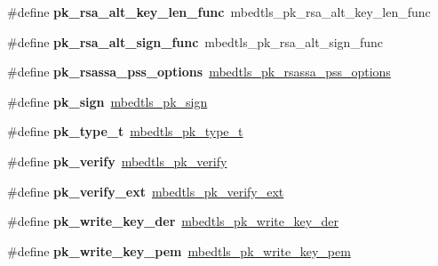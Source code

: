 \begin{DoxyCompactItemize}
\#define {\bfseries pk\+\_\+rsa\+\_\+alt\+\_\+key\+\_\+len\+\_\+func}~mbedtls\+\_\+pk\+\_\+rsa\+\_\+alt\+\_\+key\+\_\+len\+\_\+func
\item 
\mbox{\label{compat-1_83_8h_ad471f895a5d812225c8d4cad0f11d847}} 
\#define {\bfseries pk\+\_\+rsa\+\_\+alt\+\_\+sign\+\_\+func}~mbedtls\+\_\+pk\+\_\+rsa\+\_\+alt\+\_\+sign\+\_\+func
\item 
\mbox{\label{compat-1_83_8h_af4be01264f4ed1d6262f87fa44a5c256}} 
\#define {\bfseries pk\+\_\+rsassa\+\_\+pss\+\_\+options}~\mbox{\hyperlink{structmbedtls__pk__rsassa__pss__options}{mbedtls\+\_\+pk\+\_\+rsassa\+\_\+pss\+\_\+options}}
\item 
\mbox{\label{compat-1_83_8h_a47eaa47d311ef200c90a03b920f7b1cd}} 
\#define {\bfseries pk\+\_\+sign}~\mbox{\hyperlink{pk_8h_a6055db23bfff422e65b3a41400344d15}{mbedtls\+\_\+pk\+\_\+sign}}
\item 
\mbox{\label{compat-1_83_8h_ad7ae196adc1f1af4fa92668f0a2d721e}} 
\#define {\bfseries pk\+\_\+type\+\_\+t}~\mbox{\hyperlink{pk_8h_a3fe41eff5605ae727eb9d28dad297020}{mbedtls\+\_\+pk\+\_\+type\+\_\+t}}
\item 
\mbox{\label{compat-1_83_8h_a2ef728cb3127a9bf8e3248fe680f5a74}} 
\#define {\bfseries pk\+\_\+verify}~\mbox{\hyperlink{pk_8h_abf1939cc1d89f6b9fd341b67d5241914}{mbedtls\+\_\+pk\+\_\+verify}}
\item 
\mbox{\label{compat-1_83_8h_ab437028956d8b7da15fada82647e8312}} 
\#define {\bfseries pk\+\_\+verify\+\_\+ext}~\mbox{\hyperlink{pk_8h_a81f0c5e40b839f5eca676c2c2752036f}{mbedtls\+\_\+pk\+\_\+verify\+\_\+ext}}
\item 
\mbox{\label{compat-1_83_8h_aa627fd808393eadf3c33f55e804b334e}} 
\#define {\bfseries pk\+\_\+write\+\_\+key\+\_\+der}~\mbox{\hyperlink{pk_8h_a698b57f2d3074eff3f8b668b12f4dbae}{mbedtls\+\_\+pk\+\_\+write\+\_\+key\+\_\+der}}
\item 
\mbox{\label{compat-1_83_8h_ab9a31d25f4d486cf8be15998e76c65e5}} 
\#define {\bfseries pk\+\_\+write\+\_\+key\+\_\+pem}~\mbox{\hyperlink{pk_8h_a9d199cfd9756b157b1270f2f1e170ac2}{mbedtls\+\_\+pk\+\_\+write\+\_\+key\+\_\+pem}}

\end{DoxyCompactItemize}
